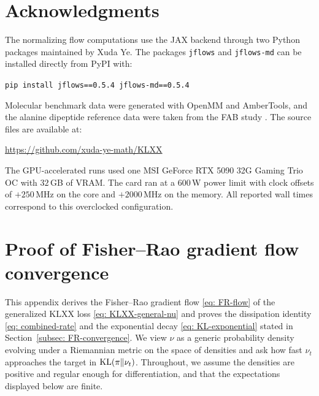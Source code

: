 \documentclass{article}
\begin{document}
\section*{Acknowledgments}

The normalizing flow computations use the JAX backend through two Python packages maintained by Xuda Ye. The packages \texttt{jflows} and \texttt{jflows-md} can be installed directly from PyPI with:
\begin{tcolorbox}[colback=gray!12,boxrule=0pt,arc=2pt,left=6pt,right=6pt,top=4pt,bottom=4pt]
\texttt{pip install jflows==0.5.4 jflows-md==0.5.4}
\end{tcolorbox}
\noindent
Molecular benchmark data were generated with OpenMM and AmberTools, and the alanine dipeptide reference data were taken from the FAB study \citep{midgley2022flow}. The source files are available at:
\begin{tcolorbox}[colback=gray!12,boxrule=0pt,arc=2pt,left=6pt,right=6pt,top=4pt,bottom=4pt]
\url{https://github.com/xuda-ye-math/KLXX}
\end{tcolorbox}
\noindent
The GPU-accelerated runs used one MSI GeForce RTX 5090 32G Gaming Trio OC with $32$\,GB of VRAM. The card ran at a $600$\,W power
limit with clock offsets of $+250$\,MHz on the core and $+2000$\,MHz on the
memory. All reported wall times correspond to this overclocked
configuration.

{
	
	
}

\clearpage
\appendix

\section{Proof of Fisher--Rao gradient flow convergence}
\label{sec: appendix-FR}

This appendix derives the Fisher--Rao gradient flow \eqref{eq: FR-flow} of the generalized KLXX loss \eqref{eq: KLXX-general-nu} and proves the dissipation identity \eqref{eq: combined-rate} and the exponential decay \eqref{eq: KL-exponential} stated in Section~\ref{subsec: FR-convergence}. We view $\nu$ as a generic probability density evolving under a Riemannian metric on the space of densities \citep{ambrosio2008gradient,villani2009optimal} and ask how fast $\nu_t$ approaches the target in $\mathrm{KL}(\pi\|\nu_t)$.
Throughout, we assume the densities are positive and regular enough for differentiation, and that the expectations displayed below are finite.
\end{document}
